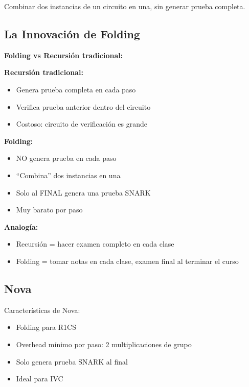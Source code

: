 \documentclass[11pt,a4paper,twoside]{book}
\begin{document}
\begin{definition}[Folding]
Combinar dos instancias de un circuito en una, sin generar prueba completa.
\end{definition}

\subsection{La Innovaci\'on de Folding}

\begin{intuicion}
\textbf{Folding vs Recursi\'on tradicional:}

\textbf{Recursi\'on tradicional:}
\begin{itemize}
    \item Genera prueba completa en cada paso
    \item Verifica prueba anterior dentro del circuito
    \item Costoso: circuito de verificaci\'on es grande
\end{itemize}

\textbf{Folding:}
\begin{itemize}
    \item NO genera prueba en cada paso
    \item ``Combina'' dos instancias en una
    \item Solo al FINAL genera una prueba SNARK
    \item Muy barato por paso
\end{itemize}

\textbf{Analog\'ia:}
\begin{itemize}
    \item Recursi\'on = hacer examen completo en cada clase
    \item Folding = tomar notas en cada clase, examen final al terminar el curso
\end{itemize}
\end{intuicion}

\subsection{Nova}

Caracter\'isticas de Nova:
\begin{itemize}
    \item Folding para R1CS
    \item Overhead m\'inimo por paso: 2 multiplicaciones de grupo
    \item Solo genera prueba SNARK al final
    \item Ideal para IVC
\end{itemize}
\end{document}
